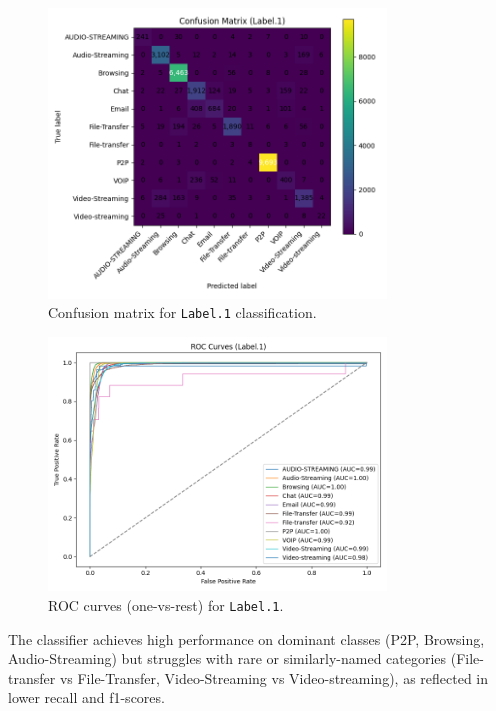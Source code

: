 \documentclass[12pt]{article}
\begin{document}
\begin{figure}[H]
  \centering
  \includegraphics[width=0.8\textwidth]{images/cm_Label.1.png}
  \caption{Confusion matrix for \texttt{Label.1} classification.}
  \label{fig:cm_label1}
\end{figure}

\begin{figure}[H]
  \centering
  \includegraphics[width=0.8\textwidth]{images/roc_Label.1.png}
  \caption{ROC curves (one-vs-rest) for \texttt{Label.1}.}
  \label{fig:roc_label1}
\end{figure}

The classifier achieves high performance on dominant classes (P2P, Browsing, Audio-Streaming) but struggles with rare or similarly-named categories (File-transfer vs File-Transfer, Video-Streaming vs Video-streaming), as reflected in lower recall and f1-scores.
\end{document}
